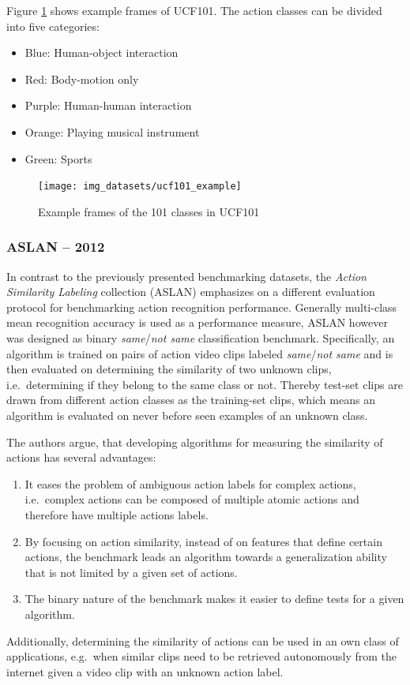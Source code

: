 Figure \ref{fig:ucf101_example} shows example frames of UCF101.
The action classes can be divided into five categories: \cite{soomro_ucf101:_2012}
\begin{itemize}
    \item Blue: Human-object interaction
    \item Red: Body-motion only
    \item Purple: Human-human interaction
    \item Orange: Playing musical instrument
    \item Green: Sports
\end{itemize}

\begin{figure}
    \centering
    \texttt{[image: img\_datasets/ucf101\_example]}
    \caption{Example frames of the 101 classes in UCF101 \cite{soomro_ucf101:_2012}}
    \label{fig:ucf101_example}
\end{figure}


\subsubsection{ASLAN -- 2012}
In contrast to the previously presented benchmarking datasets, the \textit{Action Similarity Labeling} collection (ASLAN) \cite{kliper-gross_action_2012} emphasizes on a different evaluation protocol for benchmarking action recognition performance.
Generally multi-class mean recognition accuracy is used as a performance measure, ASLAN however was designed as binary \textit{same}/\textit{not same} classification benchmark.
Specifically, an algorithm is trained on pairs of action video clips labeled \textit{same}/\textit{not same} and is then evaluated on determining the similarity of two unknown clips, i.e.\ determining if they belong to the same class or not.
Thereby test-set clips are drawn from different action classes as the training-set clips, which means an algorithm is evaluated on never before seen examples of an unknown class.

The authors \textcite{kliper-gross_action_2012} argue, that developing algorithms for measuring the similarity of actions has several advantages:
\begin{enumerate}
    \item It eases the problem of ambiguous action labels for complex actions, i.e.\ complex actions can be composed of multiple atomic actions and therefore have multiple actions labels.
    \item By focusing on action similarity, instead of on features that define certain actions, the benchmark leads an algorithm towards a generalization ability that is not limited by a given set of actions.
    \item The binary nature of the benchmark makes it easier to define tests for a given algorithm.
\end{enumerate}
Additionally, determining the similarity of actions can be used in an own class of applications, e.g.\ when similar clips need to be retrieved autonomously from the internet given a video clip with an unknown action label.

